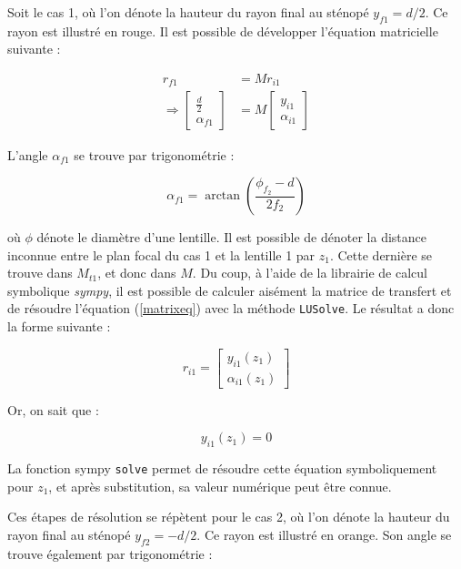 \documentclass[11pt,letterpaper]{article}
\begin{document}
Soit le cas 1, où l'on dénote la hauteur du rayon final au sténopé $y_{f1} = d/2$. Ce rayon est illustré en rouge. Il est possible de développer l'équation matricielle suivante :

\begin{align}
  r_{f1}&= M r_{i1}\label{matrixeq}\\
  \Rightarrow\begin{bmatrix}
    \frac{d}{2}  \\
    \alpha_{f1}
  \end{bmatrix} &= 
  M \begin{bmatrix}
    y_{i1} \\
    \alpha_{i1}
  \end{bmatrix}
\end{align}

L'angle $\alpha_{f1}$ se trouve par trigonométrie :

\begin{equation}
  \alpha_{f1}= \arctan\left( \frac{\phi_{f_{2}}-d}{2f_{2}} \right)
\end{equation}

où $\phi$ dénote le diamètre d'une lentille. Il est possible de dénoter la distance inconnue entre le plan focal du cas 1 et la lentille 1 par $z_{1}$. Cette dernière se trouve dans $M_{t1}$, et donc dans $M$. Du coup, à l'aide de la librairie de calcul symbolique \textit{sympy}, il est possible de calculer aisément la matrice de transfert et de résoudre l'équation (\ref{matrixeq}) avec la méthode \texttt{LUSolve}. Le résultat a donc la forme suivante :

\begin{equation}
  r_{i1}= \begin{bmatrix}
   y_{i1}(z_{1})  \\
    \alpha_{i1}(z_{1})
  \end{bmatrix}
\end{equation}

Or, on sait que :

\begin{equation}
  y_{i1}(z_{1})=0
\end{equation}

La fonction sympy \texttt{solve} permet de résoudre cette équation symboliquement pour $z_{1}$, et après substitution, sa valeur numérique peut être connue.

Ces étapes de résolution se répètent pour le cas 2, où l'on dénote la hauteur du rayon final au sténopé $y_{f2} = -d/2$. Ce rayon est illustré en orange. Son angle se trouve également par trigonométrie :
\end{document}
